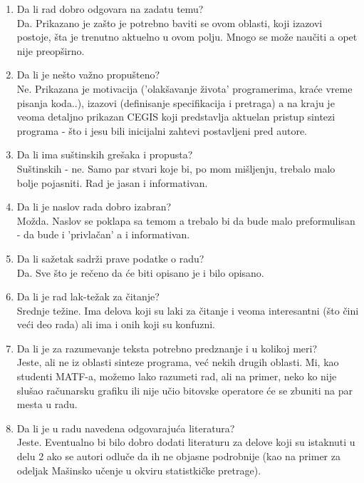 \documentclass[a4paper]{report}
\begin{document}
\begin{enumerate}
\item Da li rad dobro odgovara na zadatu temu?\\
Da. Prikazano je zašto je potrebno baviti se ovom oblasti, koji izazovi postoje, šta je trenutno aktuelno u ovom polju. Mnogo se može naučiti a opet nije preopširno.

\item Da li je nešto važno propušteno?\\
Ne. Prikazana je motivacija ('olakšavanje života' programerima, kraće vreme pisanja koda..), izazovi (definisanje specifikacija i pretraga) a na kraju je veoma detaljno prikazan CEGIS koji predstavlja aktuelan pristup sintezi programa - što i jesu bili inicijalni zahtevi postavljeni pred autore.

\item Da li ima suštinskih grešaka i propusta?\\
Suštinskih - ne. Samo par stvari koje bi, po mom mišljenju, trebalo malo bolje pojasniti. Rad je jasan i informativan.

\item Da li je naslov rada dobro izabran?\\
Možda. Naslov se poklapa sa temom a trebalo bi da bude malo preformulisan - da bude i 'privlačan' a i informativan.

\item Da li sažetak sadrži prave podatke o radu?\\
Da. Sve što je rečeno da će biti opisano je i bilo opisano.

\item Da li je rad lak-težak za čitanje?\\
Srednje težine. Ima delova koji su laki za čitanje i veoma interesantni (što čini veći deo rada) ali ima i onih koji su konfuzni.

\item Da li je za razumevanje teksta potrebno predznanje i u kolikoj meri?\\
Jeste, ali ne iz oblasti sinteze programa, već nekih drugih oblasti. Mi, kao studenti MATF-a, možemo lako razumeti rad, ali na primer, neko ko nije slušao računarsku grafiku ili nije učio bitovske operatore će se zbuniti na par mesta u radu.

\item Da li je u radu navedena odgovarajuća literatura?\\
Jeste. Eventualno bi bilo dobro dodati literaturu za delove koji su istaknuti u delu 2 ako se autori odluče da ih ne objasne podrobnije (kao na primer za odeljak Mašinsko učenje u okviru statistkičke pretrage).


\end{enumerate}
\end{document}
